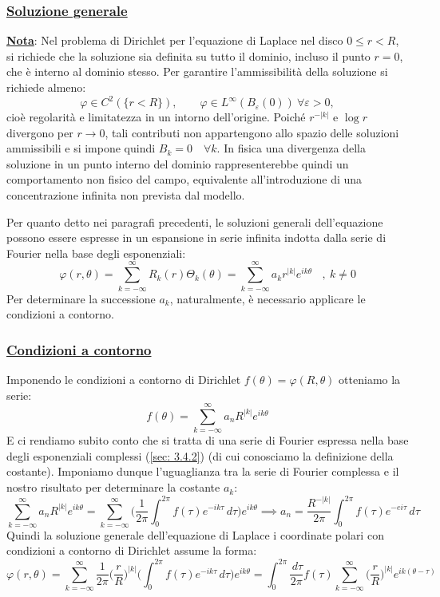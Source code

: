 \documentclass[a4paper,12pt]{report}
\begin{document}
\subsubsection{\underline{Soluzione generale}}



\underline{\textbf{Nota}}: Nel problema di Dirichlet per l’equazione di Laplace nel disco $0\le r<R$, si richiede che la soluzione sia definita su tutto il dominio, incluso il punto $r=0$, che è interno al dominio stesso. Per garantire l’ammissibilità della soluzione si richiede almeno:
\[
\varphi \in C^2(\{r<R\}), 
\qquad 
\varphi \in L^\infty(B_\varepsilon(0)) \ \forall \varepsilon>0,
\]
cioè regolarità e limitatezza in un intorno dell’origine. Poiché $r^{-|k|}$ e $\log r$ divergono per $r\to 0$, tali contributi non appartengono allo spazio delle soluzioni ammissibili e si impone quindi $B_k=0 \quad \forall k$. In fisica una divergenza della soluzione in un punto interno del dominio rappresenterebbe quindi un comportamento non fisico del campo, equivalente all’introduzione di una concentrazione infinita non prevista dal modello.

\newpage

Per quanto detto nei paragrafi precedenti, le soluzioni generali dell'equazione possono essere espresse in un espansione in serie infinita indotta dalla serie di Fourier nella base degli esponenziali:
\[\varphi(r,\theta)=\sum_{k=-\infty}^\infty R_k(r)\Theta_k(\theta)=\sum_{k=-\infty}^\infty a_kr^{|k|}e^{ik\theta}\ \ \ \ ,  \ k\neq0
\]
Per determinare la successione $a_k$, naturalmente, è necessario applicare le condizioni a contorno.

\subsubsection{\underline{Condizioni a contorno}}

Imponendo le condizioni a contorno di Dirichlet $f(\theta)=\varphi(R,\theta)$ otteniamo la serie:
\[f(\theta)=\sum_{k=-\infty}^\infty a_nR^{|k|}e^{ik\theta}\]
E ci rendiamo subito conto che si tratta di una serie di Fourier espressa nella base degli esponenziali complessi (\ref{sec: 3.4.2}) (di cui conosciamo la definizione della costante). Imponiamo dunque l'uguaglianza tra la serie di Fourier complessa e il nostro risultato per determinare la costante $a_k$:
\[\sum_{k=-\infty}^\infty a_nR^{|k|}e^{ik\theta}=\sum_{k=-\infty}^\infty\bigg(\frac{1}{2\pi}\int_0^{2\pi}f(\tau)e^{-ik\tau}\,d\tau\bigg)e^{ik\theta}\implies a_n=\frac{R^{-|k|}}{2\pi}\int_0^{2\pi}f(\tau)e^{-ei\tau}\,d\tau\]
Quindi la soluzione generale dell'equazione di Laplace i coordinate polari con condizioni a contorno di Dirichlet assume la forma:
\[\varphi(r,\theta)=\sum_{k=-\infty}^\infty\frac{1}{2\pi}\bigg(\frac{r}R\bigg)^{|k|}\bigg(\int_0^{2\pi}f(\tau)e^{-ik\tau}\,d\tau\bigg)e^{ik\theta}=\int_0^{2\pi}\frac{\,d\tau}{2\pi}f(\tau)\sum_{k=-\infty}^\infty\bigg(\frac{r}{R}\bigg)^{|k|}e^{ik(\theta-\tau)} \]
\end{document}

